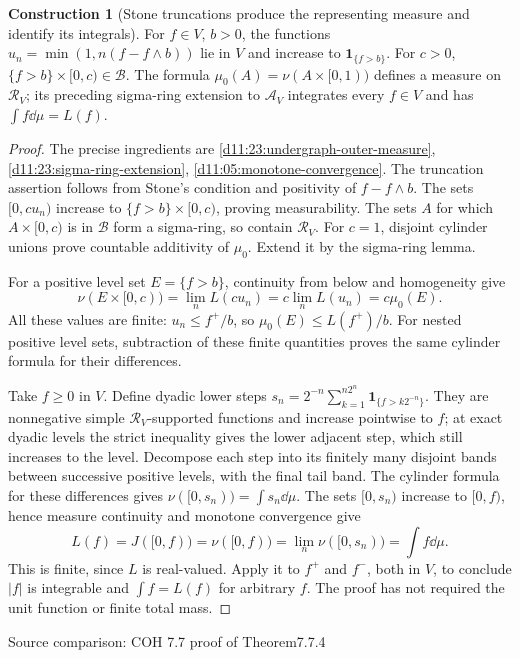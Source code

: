 \documentclass[11pt,oneside,openany]{book}
\theoremstyle{definition}
\newtheorem{construction}[theorem]{Construction}
\theoremstyle{remark}
\newcommand{\one}{\mathbf1}\newcommand{\ind}[1]{\mathbf1_{#1}}
\newcommand{\family}[1]{}
\newcommand{\source}[1]{\par\begingroup\small\sffamily\color{black!65}Source comparison: #1\par\endgroup}
\begin{document}
\begin{construction}[Stone truncations produce the representing measure and identify its integrals]\family{D11.23.level_cylinder_representation}\label{d11:23:level-cylinder-representation}
For $f\in V$, $b>0$, the functions $u_n=\min(1,n(f-f\wedge b))$ lie in $V$ and increase to $\one_{\{f>b\}}$. For $c>0$, $\{f>b\}\times[0,c)\in\mathcal B$. The formula $\mu_0(A)=\nu(A\times[0,1))$ defines a measure on $\mathcal R_V$; its preceding sigma-ring extension to $\mathcal A_V$ integrates every $f\in V$ and has $\int f\dd\mu=L(f)$.
\end{construction}
\begin{proof}
The precise ingredients are \cref{d11:23:undergraph-outer-measure}, \cref{d11:23:sigma-ring-extension}, \cref{d11:05:monotone-convergence}. The truncation assertion follows from Stone's condition and positivity of $f-f\wedge b$. The sets $[0,cu_n)$ increase to $\{f>b\}\times[0,c)$, proving measurability. The sets $A$ for which $A\times[0,c)$ is in $\mathcal B$ form a sigma-ring, so contain $\mathcal R_V$. For $c=1$, disjoint cylinder unions prove countable additivity of $\mu_0$. Extend it by the sigma-ring lemma.

For a positive level set $E=\{f>b\}$, continuity from below and homogeneity give
\[\nu(E\times[0,c))=\lim_nL(cu_n)=c\lim_nL(u_n)=c\mu_0(E).
\]
All these values are finite: $u_n\le f^+/b$, so $\mu_0(E)\le L(f^+)/b$. For nested positive level sets, subtraction of these finite quantities proves the same cylinder formula for their differences.

Take $f\ge0$ in $V$. Define dyadic lower steps
$s_n=2^{-n}\sum_{k=1}^{n2^n}\one_{\{f>k2^{-n}\}}$.
They are nonnegative simple $\mathcal R_V$-supported functions and increase pointwise to $f$; at exact dyadic levels the strict inequality gives the lower adjacent step, which still increases to the level. Decompose each step into its finitely many disjoint bands between successive positive levels, with the final tail band. The cylinder formula for these differences gives
$\nu([0,s_n))=\int s_n\dd\mu$.
The sets $[0,s_n)$ increase to $[0,f)$, hence measure continuity and monotone convergence give
\[L(f)=J([0,f))=\nu([0,f))=\lim_n\nu([0,s_n))=\int f\dd\mu.
\]
This is finite, since $L$ is real-valued. Apply it to $f^+$ and $f^-$, both in $V$, to conclude $|f|$ is integrable and $\int f=L(f)$ for arbitrary $f$. The proof has not required the unit function or finite total mass.
\end{proof}
\source{COH 7.7 proof of Theorem7.7.4}
\end{document}
